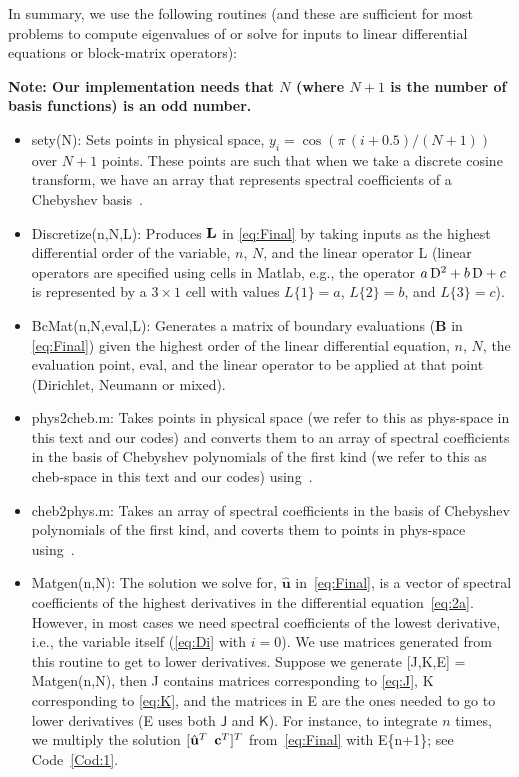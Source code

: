 \documentclass[%
secnumarabic,%
 amssymb, amsmath,%
 aps,prf,superscriptaddress,longbibliography
frontmatterverbose,
]{revtex4-2}
\begin{document}
In summary, we use the following routines (and these are sufficient for most problems to compute eigenvalues of or solve for inputs to linear differential equations or block-matrix operators):

\textbf{Note: Our implementation needs that $N$ (where $N+1$ is the number of basis functions) is an odd number.}
\begin{itemize}
  \item \textsf{sety(N)}: Sets points in physical space, $y_i = \cos (\pi \,(i + 0.5) / (N + 1))$ over $N + 1$ points. These points are such that when we take a discrete cosine transform, we have an array that represents spectral coefficients of a Chebyshev basis~\cite[Eq. 12.4.16-17]{NumRecipes}.
  \item \textsf{Discretize(n,N,L)}: Produces $\mathbf{L}$ in \eqref{eq:Final} by   taking inputs as the highest differential order of the variable, $n$, $N$, and the linear operator L (linear operators are specified using cells in Matlab, e.g., the operator $a\,\mathrm D^2 + b\,\mathrm D + c$ is represented by a $3\times 1$ cell with values $L\{1\} = a$, $L\{2\} = b$, and $L\{3\} = c$).
  \item \textsf{BcMat(n,N,eval,L)}: Generates a matrix of boundary evaluations ($\mathbf B$ in \eqref{eq:Final}) given the highest order of the linear differential equation, $n$, $N$, the evaluation point, \textsf{eval}, and the linear operator to be applied at that point (Dirichlet, Neumann or mixed). %
  \item \textsf{phys2cheb.m}: Takes points in physical space (we refer to this as phys-space in this text and our codes) and converts them to an array of spectral coefficients in the basis of Chebyshev polynomials of the first kind  (we refer to this as cheb-space in this text and our codes) using~\cite[Eq. 12.4.16-17]{NumRecipes}.
  \item \textsf{cheb2phys.m}: Takes an array of spectral coefficients in the basis of Chebyshev polynomials of the first kind, and coverts them to points in phys-space using~\cite[Eq. 12.4.16-17]{NumRecipes}.
  \item \textsf{Matgen(n,N)}: The solution we solve for, $\hat{\mathbf u}$ in~\eqref{eq:Final}, is a vector of spectral coefficients of the highest derivatives in the differential equation~\eqref{eq:2a}. However, in most cases we need spectral coefficients of the lowest derivative, i.e., the variable itself (\eqref{eq:Di} with $i = 0$). We use matrices generated from this routine to get to lower derivatives. Suppose we generate \textsf{[J,K,E] = Matgen(n,N)}, then \textsf{J} contains matrices corresponding to \eqref{eq:J}, \textsf{K} corresponding to \eqref{eq:K}, and the matrices in \textsf{E} are the ones needed to go to lower derivatives (\textsf{E} uses both $\textsf{J}$ and $\textsf{K}$). For instance, to integrate $n$ times, we multiply the solution $[\hat{\mathbf u}^T~\, \mathbf{c}^T]^T$ from~\eqref{eq:Final} with \textsf{E\{n+1\}}; see Code~\ref{Cod:1}.
\end{itemize}
\end{document}
